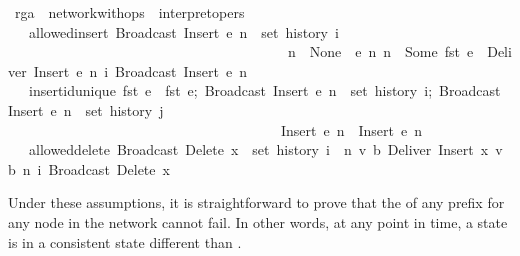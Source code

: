 \documentclass[acmlarge,review,anonymous]{acmart}\settopmatter{printfolios=true}
\begin{document}
\begin{isabellebody}
\isanewline
{}\isamarkupfalse%
\ rga\ {\isacharequal}\ network{\isacharunderscore}with{\isacharunderscore}ops\ {\isacharunderscore}\ interpret{\isacharunderscore}opers\ {\isacharplus}\isanewline
\ \ \ allowed{\isacharunderscore}insert{\isacharcolon}\ {\isachardoublequoteopen}Broadcast\ {\isacharparenleft}Insert\ e\ n{\isacharparenright}\ {\isasymin}\ set\ {\isacharparenleft}history\ i{\isacharparenright}\ {\isasymLongrightarrow}\ \isanewline
\ \ \ \ \ \ \ \ \ \ \ \ \ \ \ \ \ \ \ \ \ \ \ \ \ \ \ \ \ \ \ \ \ \ \ \ \ \ \ \ n\ {\isacharequal}\ None\ {\isasymor}\ {\isacharparenleft}{\isasymexists}e{\isacharprime}\ n{\isacharprime}{\isachardot}\ n\ {\isacharequal}\ Some\ {\isacharparenleft}fst\ e{\isacharprime}{\isacharparenright}\ {\isasymand}\ Deliver\ {\isacharparenleft}Insert\ e{\isacharprime}\ n{\isacharprime}{\isacharparenright}\ {\isasymsqsubset}\isactrlsup i\ Broadcast\ {\isacharparenleft}Insert\ e\ n{\isacharparenright}{\isacharparenright}{\isachardoublequoteclose}\isanewline
\ \ \ insert{\isacharunderscore}id{\isacharunderscore}unique{\isacharcolon}\ {\isachardoublequoteopen}{\isasymlbrakk}fst\ e{}\ {\isacharequal}\ fst\ e{};\ Broadcast\ {\isacharparenleft}Insert\ e{}\ n{}{\isacharparenright}\ {\isasymin}\ set\ {\isacharparenleft}history\ i{\isacharparenright};\ Broadcast\ {\isacharparenleft}Insert\ e{}\ n{}{\isacharparenright}\ {\isasymin}\ set\ {\isacharparenleft}history\ j{\isacharparenright}{\isasymrbrakk}\ {\isasymLongrightarrow}\isanewline
\ \ \ \ \ \ \ \ \ \ \ \ \ \ \ \ \ \ \ \ \ \ \ \ \ \ \ \ \ \ \ \ \ \ \ \ \ \ \ Insert\ e{}\ n{}\ {\isacharequal}\ Insert\ e{}\ n{}{\isachardoublequoteclose}\isanewline
\ \ \ allowed{\isacharunderscore}delete{\isacharcolon}\ {\isachardoublequoteopen}Broadcast\ {\isacharparenleft}Delete\ x{\isacharparenright}\ {\isasymin}\ set\ {\isacharparenleft}history\ i{\isacharparenright}\ {\isasymLongrightarrow}\ {\isacharparenleft}{\isasymexists}n{\isacharprime}\ v\ b{\isachardot}\ Deliver\ {\isacharparenleft}Insert\ {\isacharparenleft}x{\isacharcomma}\ v{\isacharcomma}\ b{\isacharparenright}\ n{\isacharprime}{\isacharparenright}\ {\isasymsqsubset}\isactrlsup i\ Broadcast\ {\isacharparenleft}Delete\ x{\isacharparenright}{\isacharparenright}{\isachardoublequoteclose}\isanewline
\end{isabellebody}

Under these assumptions, it is straightforward to prove that the
 of any prefix for any node in the network cannot fail.
In other words, at any point in time, a state is in a consistent state
different than .
\end{document}
